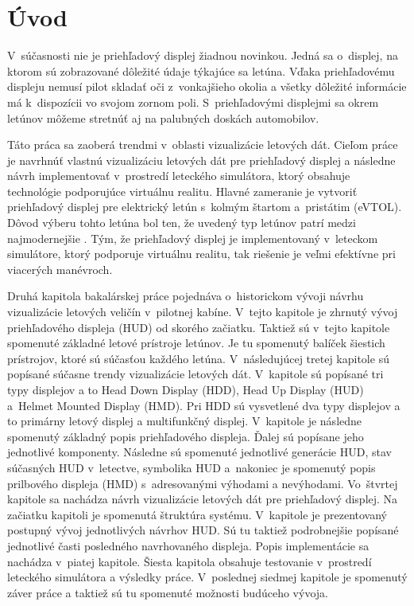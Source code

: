 
\chapter{Úvod}
V~súčasnosti nie je priehľadový displej žiadnou novinkou. Jedná sa o~displej, na ktorom sú zobrazované dôležité údaje týkajúce sa letúna. Vďaka priehľadovému displeju nemusí pilot skladať oči z~vonkajšieho okolia a všetky dôležité informácie má k~dispozícii vo svojom zornom poli. S~priehľadovými displejmi sa okrem letúnov môžeme stretnúť aj na palubných doskách automobilov.

Táto práca sa zaoberá trendmi v~oblasti vizualizácie letových dát. Cieľom práce je navrhnúť vlastnú vizualizáciu letových dát pre priehľadový displej a následne návrh implementovať v~prostredí leteckého simulátora, ktorý obsahuje technológie podporujúce virtuálnu realitu. Hlavné zameranie je vytvoriť priehľadový displej pre elektrický letún s~kolmým štartom a~pristátim (eVTOL). Dôvod výberu tohto letúna bol ten, že uvedený typ letúnov patrí medzi najmodernejšie \cite{eVTOL}. Tým, že priehľadový displej je implementovaný v~leteckom simulátore, ktorý podporuje virtuálnu realitu, tak riešenie je veľmi efektívne pri viacerých manévroch.

Druhá kapitola bakalárskej práce pojednáva o~historickom vývoji návrhu vizualizácie letových veličín v~pilotnej kabíne. V~tejto kapitole je zhrnutý vývoj priehľadového displeja (HUD) od skorého začiatku. Taktiež sú v~tejto kapitole spomenuté základné letové prístroje letúnov. Je tu spomenutý balíček šiestich prístrojov, ktoré sú súčasťou každého letúna. V~následujúcej tretej kapitole sú popísané súčasne trendy vizualizácie letových dát. V~kapitole sú popísané tri typy displejov a to Head Down Display (HDD), Head Up Display (HUD) a~Helmet Mounted Display (HMD). Pri HDD sú vysvetlené dva typy displejov a to primárny letový displej a multifunkčný displej. V~kapitole je následne spomenutý základný popis priehľadového displeja. Ďalej sú popísane jeho jednotlivé komponenty. Následne sú spomenuté jednotlivé generácie HUD, stav súčasných HUD v~letectve, symbolika HUD a~nakoniec je spomenutý popis prilbového displeja (HMD) s~adresovanými výhodami a nevýhodami. Vo~štvrtej kapitole sa nachádza návrh vizualizácie letových dát pre priehľadový displej. Na začiatku kapitoli je spomenutá štruktúra systému. V~kapitole je prezentovaný postupný vývoj jednotlivých návrhov HUD. Sú tu taktiež podrobnejšie popísané jednotlivé časti posledného navrhovaného displeja. Popis implementácie sa nachádza v~piatej kapitole. Šiesta kapitola obsahuje testovanie v~prostredí leteckého simulátora a výsledky práce. V~poslednej siedmej kapitole je spomenutý záver práce a taktiež sú tu spomenuté možnosti budúceho vývoja.\newpage

